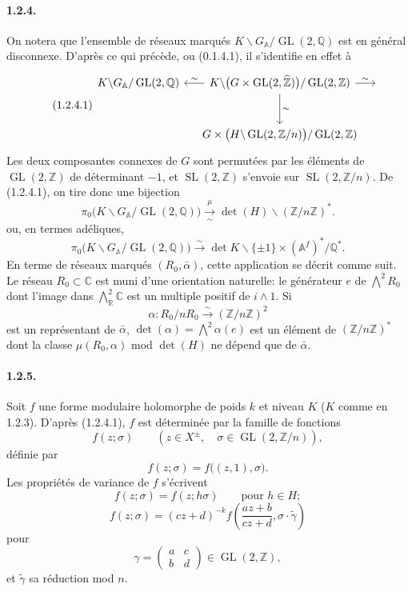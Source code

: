 \documentclass[10pt,a4paper]{article}
\providecommand{\GL}{\operatorname{GL}}
\providecommand{\SL}{\operatorname{SL}}
\providecommand{\R}{\mathbb R}
\providecommand{\Q}{\mathbb Q}
\providecommand{\Z}{\mathbb Z}
\providecommand{\C}{\mathbb C}
\providecommand{\Af}{\mathbb A^f}
\providecommand{\GA}{G_{\mathbb A}}
\providecommand{\iso}{\xrightarrow{\sim}}
\begin{document}
\paragraph{1.2.4.} On notera que l'ensemble de réseaux marqués $K\backslash\GA/\GL(2,\Q)$ est en général disconnexe. D'après ce qui précède, ou (0.1.4.1), il s'identifie en effet à
\[
\tag{1.2.4.1}
\begin{tikzcd}[row sep=large,column sep=small]
K\backslash\GA/\GL(2,\Q) & K\backslash\bigl(G\times\GL(2,\widehat{\Z})\bigr)/\GL(2,\Z) \arrow[l,"\sim"'] \arrow[d,"\sim"] \arrow[r,"\sim"] & {}\\
& G\times\bigl(H\backslash\GL(2,\Z/n)\bigr)/\GL(2,\Z) &
\end{tikzcd}
\]
Les deux composantes connexes de $G$ sont permutées par les éléments de $\GL(2,\Z)$ de déterminant $-1$, et $\SL(2,\Z)$ s'envoie sur $\SL(2,\Z/n)$. De (1.2.4.1), on tire donc une bijection
\[
\pi_0\bigl(K\backslash\GA/\GL(2,\Q)\bigr)
\xrightarrow[\sim]{\mu}
\det(H)\backslash(\Z/n\Z)^*.
\]
ou, en termes adéliques,
\[
\pi_0\bigl(K\backslash\GA/\GL(2,\Q)\bigr)
\iso
\det K\backslash\{\pm1\}\times(\Af)^*/\Q^*.
\]
En terme de réseaux marqués $(R_0,\bar\alpha)$, cette application se décrit comme suit. Le réseau $R_0\subset\C$ est muni d'une orientation naturelle: le générateur $e$ de $\bigwedge^2R_0$ dont l'image dans $\bigwedge^2_{\R}\C$ est un multiple positif de $i\wedge1$. Si\[
\alpha:R_0/nR_0\iso(\Z/n\Z)^2
\]
est un représentant de $\bar\alpha$, $\det(\alpha)=\bigwedge^2\alpha(e)$ est un élément de $(\Z/n\Z)^*$ dont la classe $\mu(R_0,\alpha)$ mod $\det(H)$ ne dépend que de $\bar\alpha$.

\clearpage
{}
\hypertarget{authority-18}{}
\paragraph{1.2.5.} Soit $f$ une forme modulaire holomorphe de poids $k$ et niveau $K$ ($K$ comme en 1.2.3). D'après (1.2.4.1), $f$ est déterminée par la famille de fonctions
\[
f(z;\sigma)\qquad(z\in X^\pm,\quad \sigma\in\GL(2,\Z/n)),
\]
définie par
\[
f(z;\sigma)=f\bigl((z,1),\sigma\bigr).
\]
Les propriétés de variance de $f$ s'écrivent
\[
\tag{1.2.5.1}
f(z;\sigma)=f(z;h\sigma)\qquad\text{pour }h\in H;
\]
\[
\tag{1.2.5.2}
f(z;\sigma)=(cz+d)^{-k}
 f\left(\frac{az+b}{cz+d},\sigma\cdot\widetilde\gamma\right)
\]
pour
\[
\gamma=\begin{pmatrix}a&c\\ b&d\end{pmatrix}\in\GL(2,\Z),
\]
et $\widetilde\gamma$ sa réduction mod $n$.
\end{document}
